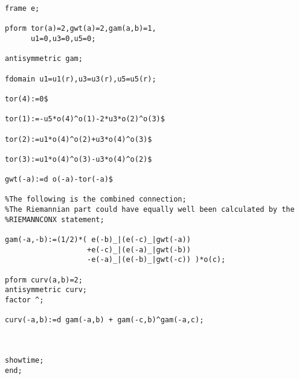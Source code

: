 {\begin{verbatim}
frame e;

pform tor(a)=2,gwt(a)=2,gam(a,b)=1,
      u1=0,u3=0,u5=0;

antisymmetric gam;

fdomain u1=u1(r),u3=u3(r),u5=u5(r);

tor(4):=0$

tor(1):=-u5*o(4)^o(1)-2*u3*o(2)^o(3)$

tor(2):=u1*o(4)^o(2)+u3*o(4)^o(3)$

tor(3):=u1*o(4)^o(3)-u3*o(4)^o(2)$

gwt(-a):=d o(-a)-tor(-a)$

%The following is the combined connection;
%The Riemannian part could have equally well been calculated by the
%RIEMANNCONX statement;

gam(-a,-b):=(1/2)*( e(-b)_|(e(-c)_|gwt(-a))
                   +e(-c)_|(e(-a)_|gwt(-b))
                   -e(-a)_|(e(-b)_|gwt(-c)) )*o(c);

pform curv(a,b)=2;
antisymmetric curv;
factor ^;

curv(-a,b):=d gam(-a,b) + gam(-c,b)^gam(-a,c);



showtime;
end;

\end{verbatim}
}

